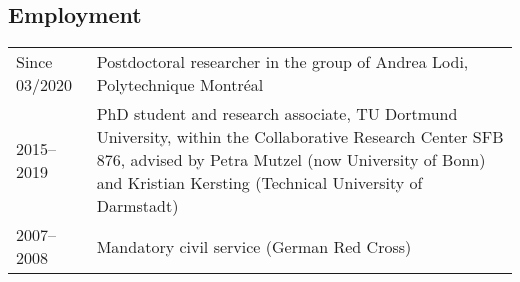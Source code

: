 \documentclass[11pt, a4paper]{scrartcl}
\begin{document}
\subsection*{Employment}
\begin{tabular}{p{2.1cm}p{12.0cm}}
	Since 03/2020& Postdoctoral researcher in the group of Andrea Lodi, Polytechnique Montréal\\
	2015--2019&PhD student and research associate, TU Dortmund University, within the Collaborative Research Center SFB 876, advised by Petra Mutzel (now University of Bonn) and Kristian Kersting (Technical University of Darmstadt)\\
	2007--2008&Mandatory civil service (German Red Cross)\\
\end{tabular}

\renewcommand{\refname}{\large\bfseries Publications}
\end{document}
